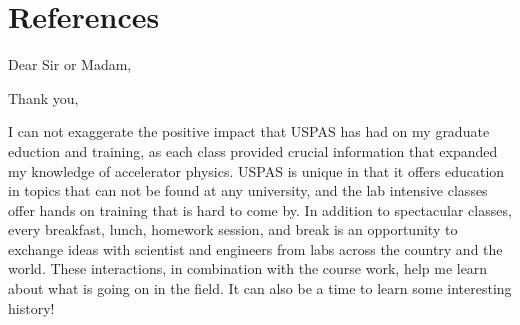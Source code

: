\documentclass[11pt,a4paper,sans]{moderncv}        %
\begin{document}
\section{References}
\begin{cvcolumns}
\end{cvcolumns}
\fi


\clearpage
\date{August 15, 2017}
\opening{Dear Sir or Madam,}
\closing{Thank you,}
\makelettertitle

I can not exaggerate the positive impact that USPAS has had on my graduate eduction and training, 
as each class provided crucial information that expanded my knowledge of accelerator physics. 
USPAS is unique in that it offers education in 
topics that can not be found at any university, and the lab intensive classes offer hands on training 
that is hard to come by. In addition to spectacular classes, every breakfast, lunch, homework session, 
and break is an opportunity to exchange ideas with scientist and engineers from labs across the country and the world.
These interactions, in combination with the course work, help me learn about what is going on in the field.
It can also be a time to learn some interesting history!
\end{document}
